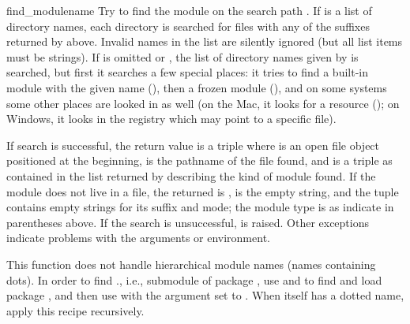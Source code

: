 \begin{funcdesc}{find_module}{name}
Try to find the module  on the search path .  If
 is a list of directory names, each directory is searched
for files with any of the suffixes returned by 
above.  Invalid names in the list are silently ignored (but all list
items must be strings).  If  is omitted or , the
list of directory names given by  is searched, but
first it searches a few special places: it tries to find a built-in
module with the given name (), then a frozen module
(), and on some systems some other places are looked
in as well (on the Mac, it looks for a resource ();
on Windows, it looks in the registry which may point to a specific
file).

If search is successful, the return value is a triple
 where
 is an open file object positioned at the beginning,
 is the pathname of the
file found, and  is a triple as contained in the list
returned by  describing the kind of module found.
If the module does not live in a file, the returned  is
,  is the empty string, and the
 tuple contains empty strings for its suffix and
mode; the module type is as indicate in parentheses above.  If the
search is unsuccessful,  is raised.  Other
exceptions indicate problems with the arguments or environment.

This function does not handle hierarchical module names (names
containing dots).  In order to find ., i.e., submodule
 of package , use  and
 to find and load package , and then use
 with the  argument set to
.  When  itself has a dotted name, apply
this recipe recursively.
\end{funcdesc}

